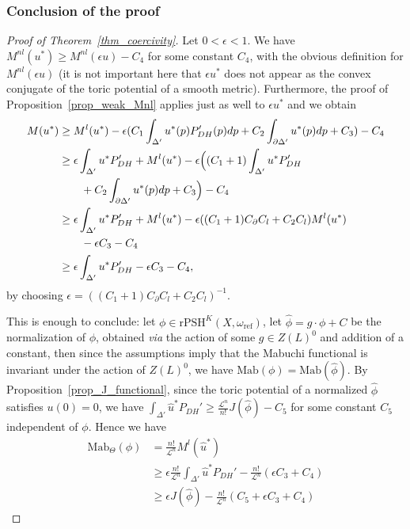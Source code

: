 \documentclass{amsart}
\theoremstyle{definition}
\begin{document}
\subsubsection{Conclusion of the proof}

\begin{proof}[Proof of Theorem~\ref{thm_coercivity}]
Let $0<\epsilon<1$. 
We have 
$M^{nl}(u^*)\geq M^{nl}(\epsilon u) - C_4$ 
for some constant $C_4$,
with the obvious definition for $M^{nl}(\epsilon u)$ (it is not 
important here that $\epsilon u^*$ does not appear as the 
convex conjugate of the toric potential of a smooth metric).
Furthermore, the proof of Proposition~\ref{prop_weak_Mnl} applies just 
as well to $\epsilon u^*$ and we obtain 
\begin{align*}
M(u^*)& \geq 
M^l(u^*)-\epsilon(C_1\int_{\Delta'} u^*(p)P_{DH}'(p)dp
+C_2\int_{\partial \Delta'}u^*(p)dp
+C_3)-C_4 \\
& \geq \epsilon \int_{\Delta'}u^*P_{DH}' 
+M^l(u^*) 
-\epsilon\Big{(}(C_1+1)\int_{\Delta'}u^*P_{DH}'\\ &  \qquad 
+
C_2\int_{\partial \Delta'}u^*(p)dp+C_3\Big{)}-C_4 \\
& \geq \epsilon \int_{\Delta'}u^*P_{DH}'
+M^l(u^*)-\epsilon((C_1+1)C_{\partial}C_l+C_2C_l)M^l(u^*)
\\ &  \qquad  -\epsilon C_3-C_4 \\
& \geq \epsilon \int_{\Delta'}u^*P_{DH}'
-\epsilon C_3-C_4, 
\end{align*}
by choosing $\epsilon=((C_1+1)C_{\partial}C_l+C_2C_l)^{-1}$.

This is enough to conclude: let $\phi\in \mathrm{rPSH}^K(X,\omega_\mathrm{ref})$, 
let $\hat{\phi}=g\cdot \phi + C$ be the normalization of $\phi$, obtained 
\emph{via} the action of some $g\in Z(L)^0$ and addition of a constant, 
then since the assumptions imply that the Mabuchi functional is 
invariant under the action of $Z(L)^0$, we have 
$\mathrm{Mab}(\phi)=\mathrm{Mab}(\hat{\phi})$. 
By Proposition~\ref{prop_J_functional}, 
since the toric potential of a normalized $\hat{\phi}$ satisfies 
$u(0)=0$, we have 
$\int_{\Delta'}\hat{u}^*P_{DH}'\geq \frac{\mathcal{L}^n}{n!}J(\hat{\phi})-C_5$ 
for some constant $C_5$ independent of $\phi$.
Hence we have 
\begin{align*}
\mathrm{Mab}_{\Theta}(\phi) & = \frac{n!}{\mathcal{L}^n}M^l(\hat{u}^*) \\
& \geq \epsilon \frac{n!}{\mathcal{L}^n}\int_{\Delta'}\hat{u}^*P_{DH}' -\frac{n!}{\mathcal{L}^n}(\epsilon C_3+C_4) \\
& \geq \epsilon J(\hat{\phi})-\frac{n!}{\mathcal{L}^n}(C_5+\epsilon C_3+C_4)
\end{align*}
\end{proof}



\end{document}
